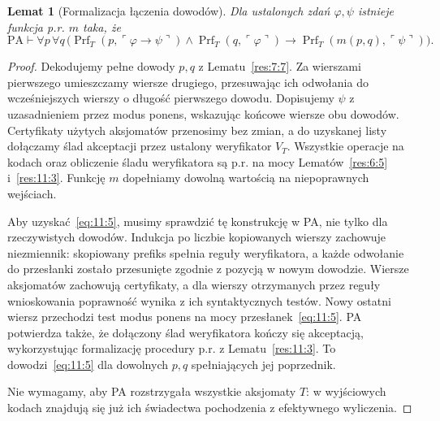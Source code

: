 \documentclass[11pt,a4paper]{article}
\numberwithin{equation}{section}
\newcommand{\PA}{\mathrm{PA}}
\theoremstyle{plain}
\newtheorem{lemat}[twierdzenie]{Lemat}
\theoremstyle{definition}
\theoremstyle{remark}
\begin{document}
\begin{lemat}[Formalizacja łączenia dowodów]\label{res:11:4}
Dla ustalonych zdań $\varphi,\psi$ istnieje funkcja p.r. $m$ taka, że
\begin{equation}\label{eq:11:5}
\PA\vdash\forall p\,\forall q\,\bigl(
\operatorname{Prf}_T(p,\ulcorner\varphi\to\psi\urcorner)
\land\operatorname{Prf}_T(q,\ulcorner\varphi\urcorner)
\to\operatorname{Prf}_T(m(p,q),\ulcorner\psi\urcorner)\bigr).
\end{equation}
\end{lemat}
\begin{proof}
Dekodujemy pełne dowody $p,q$ z Lematu~\ref{res:7:7}. Za wierszami pierwszego umieszczamy wiersze drugiego, przesuwając ich odwołania do wcześniejszych wierszy o długość pierwszego dowodu. Dopisujemy $\psi$ z uzasadnieniem przez modus ponens, wskazując końcowe wiersze obu dowodów. Certyfikaty użytych aksjomatów przenosimy bez zmian, a do uzyskanej listy dołączamy ślad akceptacji przez ustalony weryfikator $V_T$. Wszystkie operacje na kodach oraz obliczenie śladu weryfikatora są p.r. na mocy Lematów~\ref{res:6:5} i~\ref{res:11:3}. Funkcję $m$ dopełniamy dowolną wartością na niepoprawnych wejściach.

Aby uzyskać~\eqref{eq:11:5}, musimy sprawdzić tę konstrukcję w PA, nie tylko dla rzeczywistych dowodów. Indukcja po liczbie kopiowanych wierszy zachowuje niezmiennik: skopiowany prefiks spełnia reguły weryfikatora, a każde odwołanie do przesłanki zostało przesunięte zgodnie z pozycją w nowym dowodzie. Wiersze aksjomatów zachowują certyfikaty, a dla wierszy otrzymanych przez reguły wnioskowania poprawność wynika z ich syntaktycznych testów. Nowy ostatni wiersz przechodzi test modus ponens na mocy przesłanek~\eqref{eq:11:5}. PA potwierdza także, że dołączony ślad weryfikatora kończy się akceptacją, wykorzystując formalizację procedury p.r. z Lematu~\ref{res:11:3}. To dowodzi~\eqref{eq:11:5} dla dowolnych $p,q$ spełniających jej poprzednik.

Nie wymagamy, aby PA rozstrzygała wszystkie aksjomaty $T$: w wyjściowych kodach znajdują się już ich świadectwa pochodzenia z efektywnego wyliczenia.
\end{proof}
\end{document}
